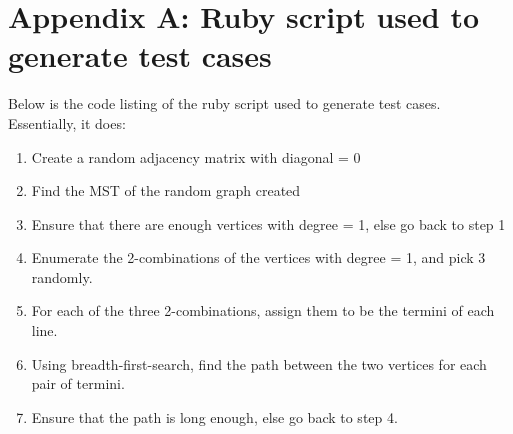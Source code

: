 \documentclass[a4paper,12pt]{article}
\begin{document}
	\newpage
	\section{Appendix A: Ruby script used to generate test cases}
	Below is the code listing of the ruby script used to generate test cases. Essentially, it does:
	\begin{enumerate}
		\item Create a random adjacency matrix with diagonal = 0
		\item Find the MST of the random graph created
		\item Ensure that there are enough vertices with degree = 1, else go back to step 1
		\item Enumerate the 2-combinations of the vertices with degree = 1, and pick 3 randomly.
		\item For each of the three 2-combinations, assign them to be the termini of each line.
		\item Using breadth-first-search, find the path between the two vertices for each pair of termini.
		\item Ensure that the path is long enough, else go back to step 4.
	\end{enumerate}
\end{document}
